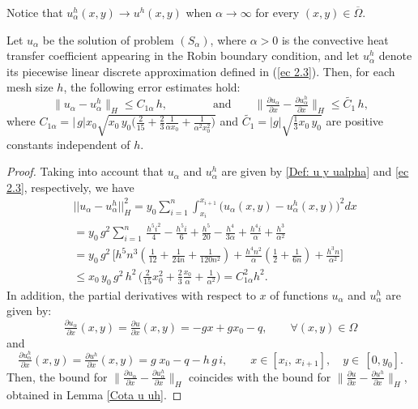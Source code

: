 \documentclass[axioms,article,submit,moreauthors]{Definitions/mdpi}
\newcommand{\dee}{d}
\newcommand{\bint}{\displaystyle\int}
\newcommand\pder[2][]{\ensuremath{\tfrac{\partial#1}{\partial#2}}}
\begin{document}
Notice that  ${u^h_{\alpha}(x,y)}\to u^h(x,y)$ when $\alpha\to \infty$  for every $(x,y)\in \overline{\Omega}$.

\begin{Lemma}\label{lema convergencia uhalpha a ualpha}
{Let} $u_{\alpha}$ {be}  the solution of {problem }$(S_\alpha)$, {where $\alpha>0$ is the convective heat transfer coefficient appearing in the Robin boundary condition, and let $u^h_{\alpha}$ denote its piecewise linear discrete approximation defined} in (\ref{ec 2.3}). {Then, for each mesh size}  $h$, {the following error estimates hold}:
     		\[\lVert u_\alpha-{u^h_{\alpha}}  \rVert _H \leq C_{1\alpha}\,h,\qquad \qquad \text{and}\qquad
\lVert \tfrac{\partial u_{\alpha }}{\partial x}-\tfrac{\partial {u^h_{\alpha}}}{\partial x} \rVert _H \leq \widetilde{C_{1}}\, h, \]
     		{where } $C_{1\alpha}= \lvert\,g\rvert x_0\sqrt{ x_0\,y_0 \Big( \frac{2}{15} +\frac{2}{3}\frac{1}{\alpha x_0} + \tfrac{1}{\alpha^2 x_0^2} \Big)  }$ and $\widetilde{C_{1}}= |g|\sqrt{\tfrac{1}{3}x_0 \, y_0} $ {are positive constants independent of $h$. }
     	
\end{Lemma}

\begin{proof}
{Taking into account that $u_\alpha$ and {$u^h_{\alpha}$} are given by \eqref{Def: u y ualpha} and \eqref{ec 2.3}, respectively}, we have
 \[\begin{array}{ll}
&     ||u_\alpha-{u^h_{\alpha}}||_{H}^2 =y_0 \displaystyle\sum\limits_{i=1}^n \bint_{x_i}^{x_{i+1}}  \big(u_\alpha(x,y)-{u^h_{\alpha}}(x,y)\big)^2  \dee x\\ 
    &=y_0 \, g^2 \displaystyle\sum\limits_{i=1}^n  \, \frac{h^5 i^2}{4}-\frac{h^5 i}{6}+\frac{h^5}{20}-\frac{h^4}{3 \alpha }+\frac{h^4 i}{\alpha }+\frac{h^3}{\alpha ^2}\\ 
   &= y_0\, g^2\, \Big[ h^5 n^3 \left( \frac{1}{12}+\frac{1}{24n}+\frac{1}{120n^2}\right) +\frac{h^4 n^2}{\alpha}\left( \frac{1}{2}+\frac{1}{6n}\right)+\frac{h^3n}{\alpha^2} \Big]\\
 &  \leq x_0\,  y_0\, g^2\,h^2 \, \Big( \frac{2}{15}x_0^2+\frac{2}{3} \frac{x_0}{\alpha}+\frac{1}{\alpha^2} \Big)=C_{1\alpha}^2 h^2.
     \end{array}\]
In addition, the {partial derivatives with respect to $x$} of functions $u_\alpha$ and {$u^h_{\alpha}$} are given by:
\[\pder[u_{\alpha}]{x}(x,y)=\pder[u]{x}(x,y)=-gx+gx_0-q,\qquad \forall (x,y)\in \Omega\] 
   and
    \[\pder[{u^h_{\alpha}}]{x}(x,y)=\pder[{u^{h}}]{x}(x,y)=  g\; x_0-q-h\,g\,i, \qquad x\in [x_i,\, x_{i+1}],\quad y\in\,[0,y_0].\]
Then, the bound for $\lVert \pder[u_{\alpha}]{x}-\pder[{u^h_{\alpha}}]{x} \rVert _H$  coincides with the bound for $\lVert \pder[u]{x}-\pder[{u^h}]{x} \rVert _H$,  obtained in Lemma \ref{Cota u uh}.
\end{proof}     
\end{document}
